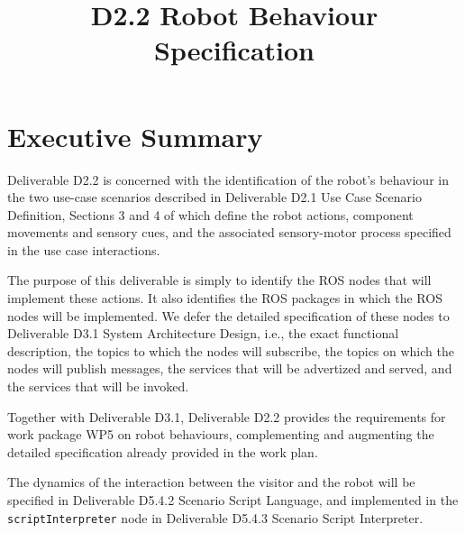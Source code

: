 \documentclass{CSSRforAfrica}
\begin{document}



\title{D2.2 Robot Behaviour Specification}  





\maketitle
 

\section*{Executive Summary}
\label{executive_summary}
 
Deliverable D2.2 is concerned with the identification of the robot’s behaviour in the two use-case scenarios described in Deliverable D2.1 Use Case Scenario Definition, Sections 3 and 4 of which define the robot actions, component movements and sensory cues, and the associated sensory-motor process specified in the use case interactions. 

The purpose of this deliverable is simply to identify the ROS nodes that will  implement these actions. It also identifies the ROS packages in which the ROS nodes will be implemented.  We defer the detailed specification of these nodes to Deliverable D3.1 System Architecture Design, i.e., the exact functional description, the topics to which the nodes will subscribe, the topics on which the nodes will publish messages, the services that will be advertized and served, and the services that will be invoked.

Together with Deliverable D3.1, Deliverable D2.2 provides the requirements for work package WP5 on robot behaviours, complementing and augmenting the detailed specification already provided in the work plan.   

The dynamics of the interaction between the visitor and the robot will be specified in Deliverable D5.4.2 Scenario Script Language, and implemented in the {\small \verb+scriptInterpreter+} node in Deliverable D5.4.3 Scenario Script Interpreter.
\end{document}
